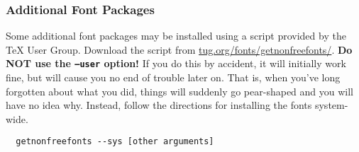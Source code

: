 {%
  \subsubsection*{Additional Font Packages}\label{subsubsec:fonts}
}

Some additional font packages may be installed using a script provided by the \TeX{} User Group.
Download the script from \url{tug.org/fonts/getnonfreefonts/}.
\textbf{Do NOT use the \texttt{--user} option!}
If you do this by accident, it will initially work fine, but will cause you no end of trouble later on.
That is, when you've long forgotten about what you did, things will suddenly go pear-shaped and you will have no idea why.
Instead, follow the directions for installing the fonts system-wide. 
\begin{verbatim}
  getnonfreefonts --sys [other arguments]
\end{verbatim}

  




